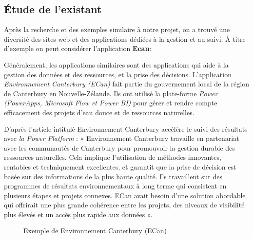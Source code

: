 \documentclass[a4paper]{report}
\begin{document}
\begin{doublespace}
	\subsection{Étude de l’existant}

	Après la recherche et des exemples similaire à notre projet, on a
	trouvé une diversité des sites web et des applications dédiées à la gestion et
	au suivi.
	À titre d'exemple on peut considérer l'application \textbf{\large Ecan}:

	Généralement, les applications similaires sont des applications qui
	aide à la gestion des données et des ressources, et la prise des décisions.
	L’application \emph{Environnement Canterbury (ECan)} fait partie du
	gouvernement local de la région de Canterbury en Nouvelle-Zélande. Ils ont
	utilisé la plate-forme \emph{Power
		(PowerApps, Microsoft Flow et Power BI)} pour gérer et rendre compte
	efficacement des projets d'eau douce et de ressources naturelles.

	D’après l'article intitulé Environnement Canterbury accélère le suivi
	des
	résultats avec \emph{la Power Platform} :
	« Environnement Canterbury travaille en partenariat avec les communautés
	de
	Canterbury pour promouvoir la gestion durable des ressources
	naturelles. Cela
	implique l'utilisation de méthodes innovantes, rentables et
	techniquement
	excellentes, et garantit que la prise de décision est basée sur des
	informations
	de la plus haute qualité. Ils travaillent sur des programmes de
	résultats
	environnementaux à long terme qui consistent en plusieurs étapes et
	projets
	connexes. ECan avait besoin d'une solution abordable qui offrirait une
	plus
	grande cohérence entre les projets, des niveaux de visibilité plus
	élevés et un
	accès plus rapide aux données ».
	\begin{figure}[H]
		\begin{center}
			\caption{Exemple de Environnement Canterbury (ECan)}
		\end{center}
	\end{figure}
	\newpage

\end{doublespace}
\end{document}
